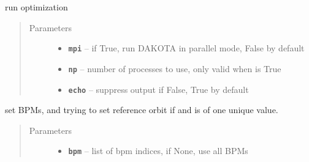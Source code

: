 \documentclass[letterpaper,10pt,english]{sphinxmanual}
\begin{document}
\begin{fulllineitems}

\begin{fulllineitems}
\label{src/apidocs/dakopt:genopt.dakopt.DakotaOC.ref_flag}
\end{fulllineitems}


\begin{fulllineitems}
\label{src/apidocs/dakopt:genopt.dakopt.DakotaOC.ref_x0}
\end{fulllineitems}


\begin{fulllineitems}
\label{src/apidocs/dakopt:genopt.dakopt.DakotaOC.ref_y0}
\end{fulllineitems}


\begin{fulllineitems}
\label{src/apidocs/dakopt:genopt.dakopt.DakotaOC.run}
run optimization
\begin{quote}\begin{description}
\item[{Parameters}] \leavevmode\begin{itemize}
\item {} 
\textbf{\texttt{mpi}} -- if True, run DAKOTA in parallel mode, False by default

\item {} 
\textbf{\texttt{np}} -- number of processes to use, only valid when  is True

\item {} 
\textbf{\texttt{echo}} -- suppress output if False, True by default

\end{itemize}

\end{description}\end{quote}

\end{fulllineitems}


\begin{fulllineitems}
\label{src/apidocs/dakopt:genopt.dakopt.DakotaOC.set_bpms}
set BPMs, and trying to set reference orbit  if  and 
is of one unique value.
\begin{quote}\begin{description}
\item[{Parameters}] \leavevmode\begin{itemize}
\item {} 
\textbf{\texttt{bpm}} -- list of bpm indices, if None, use all BPMs


\end{itemize}
\end{description}
\end{quote}
\end{fulllineitems}
\end{fulllineitems}
\end{document}
